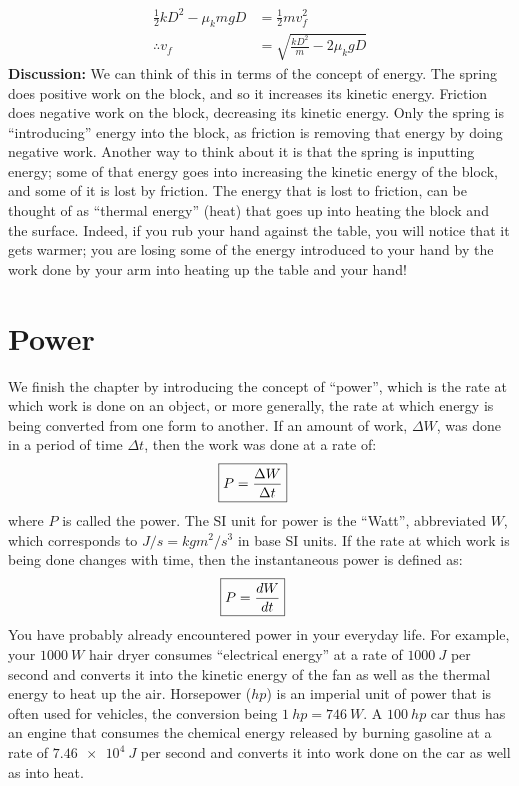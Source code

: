 \begin{example}
\begin{align*}
\frac{1}{2}kD^2-\mu_kmgD  &=\frac{1}{2}mv_f^2\\
\therefore v_f &=\sqrt{\frac{kD^2}{m}-2\mu_kgD}
\end{align*}
\textbf{Discussion:} We can think of this in terms of the concept of energy. The spring does positive work on the block, and so it increases its kinetic energy. Friction does negative work on the block, decreasing its kinetic energy. Only the spring is ``introducing'' energy into the block, as friction is removing that energy by doing negative work. Another way to think about it is that the spring is inputting energy; some of that energy goes into increasing the kinetic energy of the block, and some of it is lost by friction. The energy that is lost to friction, can be thought of as ``thermal energy'' (heat) that goes up into heating the block and the surface. Indeed, if you rub your hand against the table, you will notice that it gets warmer; you are losing some of the energy introduced to your hand by the work done by your arm into heating up the table and your hand! 
\end{example}

\section{Power}
We finish the chapter by introducing the concept of ``power'', which is the rate at which work is done on an object, or more generally, the rate at which energy is being converted from one form to another. If an amount of work, $\Delta W$, was done in a period of time $\Delta t$, then the work was done at a rate of:
\begin{align}
\Aboxed{P = \frac{\Delta W}{\Delta t}}
\end{align}
where $P$ is called the power. The SI unit for power is the ``Watt'', abbreviated $\si{W}$, which corresponds to $\si{J/s}=\si{kg m^2/s^3}$ in base SI units. If the rate at which work is being done changes with time, then the instantaneous power is defined as:
\begin{align}
\Aboxed{P = \frac{dW}{dt}}
\end{align}
You have probably already encountered power in your everyday life. For example, your $\SI{1000}{W}$ hair dryer consumes ``electrical energy'' at a rate of $\SI{1000}{J}$ per second and converts it into the kinetic energy of the fan as well as the thermal energy to heat up the air. Horsepower ($\si{hp}$) is an imperial unit of power that is often used for vehicles, the conversion being $\SI{1}{hp} = \SI{746}{W}$. A $\SI{100}{hp}$ car thus has an engine that consumes the chemical energy released by burning gasoline at a rate of $\SI{7.46e4}{J}$ per second and converts it into work done on the car as well as into heat. 

